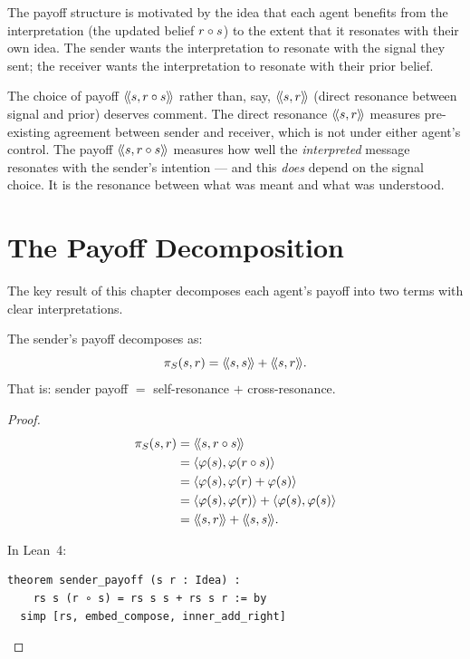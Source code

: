 The payoff structure is motivated by the idea that each agent benefits from
the interpretation (the updated belief $r \circ s$) to the extent that it
resonates with their own idea. The sender wants the interpretation to resonate
with the signal they sent; the receiver wants the interpretation to resonate
with their prior belief.

\begin{remark}
\label{rmk:payoff-motivation}
The choice of payoff $\langle\!\langle s, r \circ s \rangle\!\rangle$ rather than, say,
$\langle\!\langle s, r \rangle\!\rangle$ (direct resonance between signal and prior) deserves comment.
The direct resonance $\langle\!\langle s, r \rangle\!\rangle$ measures pre-existing agreement between
sender and receiver, which is not under either agent's control. The payoff
$\langle\!\langle s, r \circ s \rangle\!\rangle$ measures how well the \emph{interpreted} message
resonates with the sender's intention --- and this \emph{does} depend on the
signal choice. It is the resonance between what was meant and what was
understood.
\end{remark}


\section{The Payoff Decomposition}

The key result of this chapter decomposes each agent's payoff into two terms
with clear interpretations.

\begin{theorem}
\label{thm:sender-payoff}
The sender's payoff decomposes as:
\[
  \pi_{S}(s, r) = \langle\!\langle s, s \rangle\!\rangle + \langle\!\langle s, r \rangle\!\rangle.
\]
That is: sender payoff $=$ self-resonance $+$ cross-resonance.
\end{theorem}

\begin{proof}
\begin{align*}
  \pi_{S}(s, r)
  &= \langle\!\langle s, r \circ s \rangle\!\rangle \\
  &= \langle \varphi(s), \varphi(r \circ s) \rangle \\
  &= \langle \varphi(s), \varphi(r) + \varphi(s) \rangle \\
  &= \langle \varphi(s), \varphi(r) \rangle + \langle \varphi(s), \varphi(s) \rangle \\
  &= \langle\!\langle s, r \rangle\!\rangle + \langle\!\langle s, s \rangle\!\rangle.
\end{align*}

In Lean~4:
\begin{lstlisting}
theorem sender_payoff (s r : Idea) :
    rs s (r ∘ s) = rs s s + rs s r := by
  simp [rs, embed_compose, inner_add_right]
\end{lstlisting}
\end{proof}

